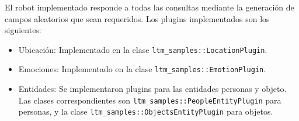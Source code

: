 El robot implementado responde a todas las consultas mediante la generación de campos aleatorios que sean requeridos. Los plugins implementados son los siguientes:
\begin{itemize}
	\item Ubicación: Implementado en la clase \texttt{ltm\_samples::LocationPlugin}.
	\item Emociones: Implementado en la clase \texttt{ltm\_samples::EmotionPlugin}.
	\item Entidades: Se implementaron plugins para las entidades personas y objeto. Las clases correspondientes son \texttt{ltm\_samples::PeopleEntityPlugin} para personas, y la clase  \texttt{ltm\_samples::ObjectsEntityPlugin} para objetos.
\end{itemize}













